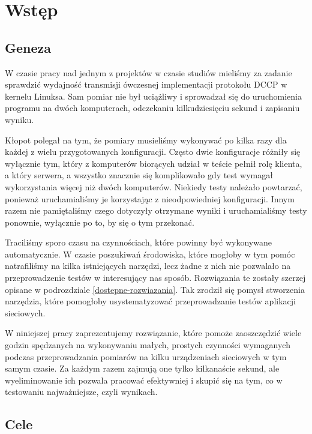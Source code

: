 \documentclass[00-praca-magisterska.tex]{subfiles}
\begin{document}
\chapter{Wstęp}

\section{Geneza}

W czasie pracy nad jednym z projektów w czasie studiów mieliśmy za zadanie
sprawdzić wydajność transmisji ówczesnej implementacji protokołu DCCP w kernelu
Linuksa.  Sam pomiar nie był uciążliwy i sprowadzał się do uruchomienia
programu na dwóch komputerach, odczekaniu kilkudziesięciu sekund i zapisaniu
wyniku.

Kłopot polegał na tym, że pomiary musieliśmy wykonywać po kilka razy dla
każdej z wielu przygotowanych konfiguracji. Często dwie konfiguracje różniły się
wyłącznie tym, który z komputerów biorących udział w teście pełnił rolę klienta,
a który serwera, a wszystko znacznie się komplikowało gdy test wymagał
wykorzystania więcej niż dwóch komputerów. Niekiedy testy należało powtarzać,
ponieważ uruchamialiśmy je korzystając z nieodpowiedniej konfiguracji. Innym
razem nie pamiętaliśmy czego dotyczyły otrzymane wyniki i uruchamialiśmy testy
ponownie, wyłącznie po to, by się o tym przekonać.

Traciliśmy sporo czasu na czynnościach, które powinny być wykonywane
automatycznie. W czasie poszukiwań środowiska, które mogłoby w tym pomóc
natrafiliśmy na kilka istniejących narzędzi, lecz żadne z nich nie pozwalało
na przeprowadzenie testów w interesujący nas sposób. Rozwiązania te zostały
szerzej opisane w podrozdziale \ref{dostepne-rozwiazania}. Tak
zrodził się pomysł stworzenia narzędzia, które pomogłoby usystematyzować
przeprowadzanie testów aplikacji sieciowych.

W niniejszej pracy zaprezentujemy rozwiązanie, które pomoże zaoszczędzić wiele
godzin spędzanych na wykonywaniu małych, prostych czynności wymaganych podczas
przeprowadzania pomiarów na kilku urządzeniach sieciowych w tym samym czasie.
Za każdym razem zajmują one tylko kilkanaście sekund, ale wyeliminowanie ich
pozwala pracować efektywniej i skupić się na tym, co w testowaniu
najważniejsze, czyli wynikach.

\section{Cele}
\end{document}
